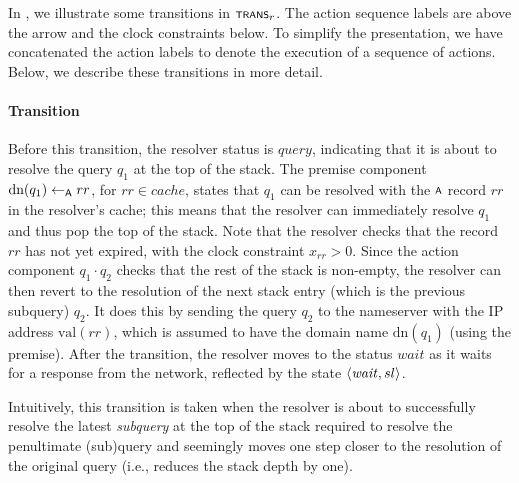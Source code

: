 In , we illustrate some transitions in $\trans_r$. The action sequence labels are above the arrow and the clock constraints below. To simplify the presentation, we have concatenated the action labels to denote the execution of a sequence of actions. Below, we describe  these transitions in more detail.

\paragraph{Transition } %

Before this transition, the resolver status is $\mathit{query}$, indicating that it is about to resolve the query $q_1$ at the top of the stack. The premise component $\text{dn}(q_1) \leftarrow_{\scrsf{a}} rr$, for $rr\in cache$, states that $q_1$ can be resolved with the $\scrsf{a}$ record $rr$ in the resolver's cache; this means that the resolver can immediately resolve $q_1$ and thus pop the top of the stack. Note that the resolver checks that the record $rr$ has not yet expired, with the clock constraint $x_{rr} > 0$. Since the action component $q_1\cdot q_2$ checks that the rest of the stack is non-empty, the resolver can then revert to the resolution of the next stack entry (which is the previous subquery) $q_2$. It does this by sending the query $q_2$ to the nameserver with the IP address $\text{val}(rr)$, which is assumed to have the domain name $\text{dn}(q_1)$ (using the premise). After the transition, the resolver moves to the status $\mathit{wait}$ as it waits for a response from the network, reflected by the state $\langle \mathit{wait},sl \rangle$.

Intuitively, this transition is taken when the resolver is about to successfully resolve the latest \emph{subquery} at the top of the stack required to resolve the penultimate (sub)query and seemingly moves one step closer to the resolution of the original query (i.e., reduces the stack depth by one).

